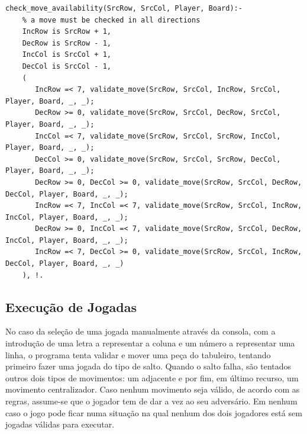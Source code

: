 \documentclass[a4paper]{article}
\begin{document}
\begin{lstlisting}[style=customprolog]
check_move_availability(SrcRow, SrcCol, Player, Board):-
	% a move must be checked in all directions
	IncRow is SrcRow + 1,
	DecRow is SrcRow - 1,
	IncCol is SrcCol + 1,
	DecCol is SrcCol - 1,
	(
	   IncRow =< 7, validate_move(SrcRow, SrcCol, IncRow, SrcCol, Player, Board, _, _);
	   DecRow >= 0, validate_move(SrcRow, SrcCol, DecRow, SrcCol, Player, Board, _, _);
	   IncCol =< 7, validate_move(SrcRow, SrcCol, SrcRow, IncCol, Player, Board, _, _);
	   DecCol >= 0, validate_move(SrcRow, SrcCol, SrcRow, DecCol, Player, Board, _, _);
	   DecRow >= 0, DecCol >= 0, validate_move(SrcRow, SrcCol, DecRow, DecCol, Player, Board, _, _);
	   IncRow =< 7, IncCol =< 7, validate_move(SrcRow, SrcCol, IncRow, IncCol, Player, Board, _, _);
	   DecRow >= 0, IncCol =< 7, validate_move(SrcRow, SrcCol, DecRow, IncCol, Player, Board, _, _);
	   IncRow =< 7, DecCol >= 0, validate_move(SrcRow, SrcCol, IncRow, DecCol, Player, Board, _, _)
	), !.
\end{lstlisting}

\subsection{Execução de Jogadas}
No caso da seleção de uma jogada manualmente através da consola, com a introdução de uma letra a representar a coluna e um número a representar uma linha, o programa tenta validar e mover uma peça do tabuleiro, tentando primeiro fazer uma jogada do tipo de salto. Quando o salto falha, são tentados outros dois tipos de movimentos: um adjacente e por fim, em último recurso, um movimento centralizador. Caso nenhum movimento seja válido, de acordo com as regras, assume-se que o jogador tem de dar a vez ao seu adversário. Em nenhum caso o jogo pode ficar numa situação na qual nenhum dos dois jogadores está sem jogadas válidas para executar.
\end{document}
